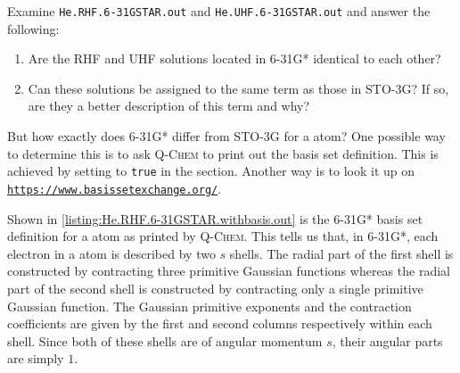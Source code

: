 			\begin{Task}
				\label{task:He.RUHF.6-31GSTAR}
				Examine \texttt{He.RHF.6-31GSTAR.out} and \texttt{He.UHF.6-31GSTAR.out} and answer the following: 
				\begin{enumerate}[topsep=0pt,itemsep=-1ex,partopsep=1ex,parsep=1ex,label=(\alph*)]
					\item Are the RHF and UHF solutions located in 6-31G* identical to each other?
					\item Can these solutions be assigned to the same term as those in STO-3G? If so, are they a better description of this term and why?
				\end{enumerate}
			\end{Task}
		
		But how exactly does 6-31G* differ from STO-3G for a  atom?
		One possible way to determine this is to ask \textsc{Q-Chem} to print out the basis set definition.
		This is achieved by setting  to \texttt{true} in the  section.
		Another way is to look it up on \href{https://www.basissetexchange.org/}{\texttt{https://www.basissetexchange.org/}}.
		
		Shown in \cref{listing:He.RHF.6-31GSTAR.withbasis.out} is the 6-31G* basis set definition for a  atom as printed by \textsc{Q-Chem}.
		This tells us that, in 6-31G*, each electron in a  atom is described by two $s$ shells. 
		The radial part of the first shell is constructed by contracting three primitive Gaussian functions whereas the radial part of the second shell is constructed by contracting only a single primitive Gaussian function.
		The Gaussian primitive exponents and the contraction coefficients are given by the first and second columns respectively within each shell.
		Since both of these shells are of angular momentum $s$, their angular parts are simply $1$.
			

